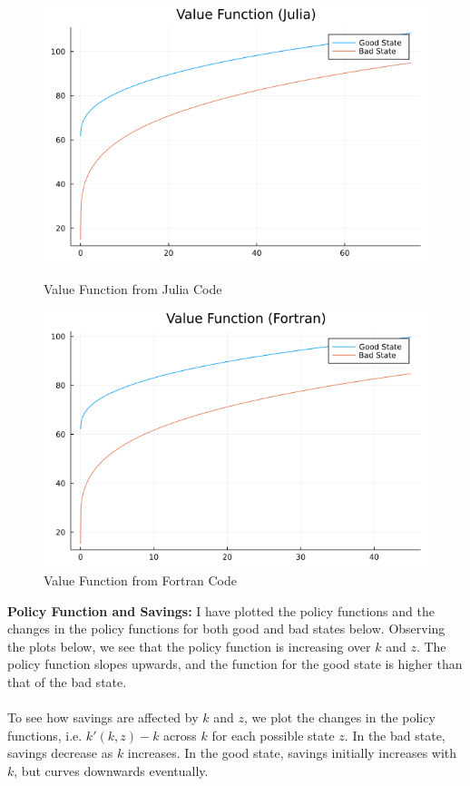 \documentclass[12pt]{article}
\begin{document}
\begin{figure} [!htbp]
    \centering
    \begin{minipage}{0.45\textwidth}
        \centering
        \includegraphics[width=\textwidth]{02_Value_Functions.png}
        \caption{Value Function from Julia Code}
    \end{minipage}\hfill
    \begin{minipage}{0.45\textwidth}
        \centering
        \includegraphics[width=\textwidth]{02_Value_Functions_Fortran.png} 
        \caption{Value Function from Fortran Code}
    \end{minipage}
\end{figure}

\newpage
\noindent \textbf{Policy Function and Savings: } I have plotted the policy functions and the changes in the policy functions for both good and bad states below. Observing the plots below, we see that the policy function is increasing over $k$ and $z$. The policy function slopes upwards, and the function for the good state is higher than that of the bad state. \\\\
To see how savings are affected by $k$ and $z$, we plot the changes in the policy functions, i.e. $k'(k, z) - k$ across $k$ for each possible state $z$. In the bad state, savings decrease as $k$ increases. In the good state, savings initially increases with $k$, but curves downwards eventually. 
\end{document}
